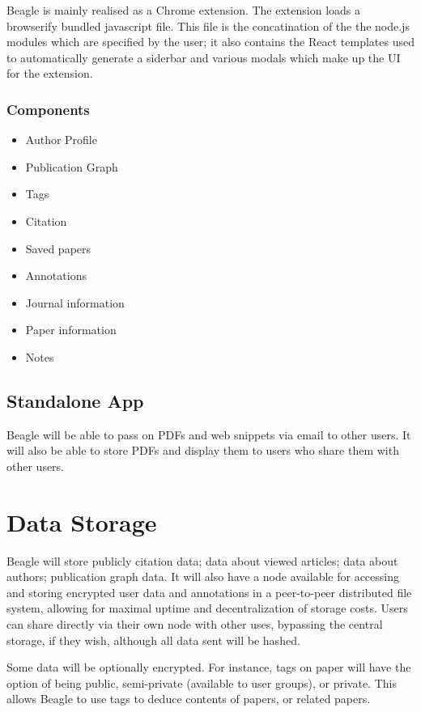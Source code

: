 \documentclass{sig-alternate}
\begin{document}
Beagle is mainly realised as a Chrome extension. The extension loads a browserify
bundled javascript file. This file is the concatination of the the node.js
modules which are specified by the user; it also contains the React templates used
to automatically generate a siderbar and various modals which make up the UI for
the extension.

\subsubsection{Components}
\begin{itemize}
  \item Author Profile
  \item Publication Graph
  \item Tags
  \item Citation
  \item Saved papers
  \item Annotations
  \item Journal information
  \item Paper information
  \item Notes
\end{itemize}

\subsection{Standalone App}

Beagle will be able to pass on PDFs and web snippets via email to other users.
It will also be able to store PDFs and display them to users who share them with
other users.  %



\section{Data Storage}

Beagle will store publicly citation data; data about viewed articles; data about authors;
publication graph data. It will also have a node available for accessing and storing
encrypted user data and annotations in a peer-to-peer distributed file system,
allowing for maximal uptime and decentralization of storage costs. Users can share
directly via their own node with other uses, bypassing the central storage, if
they wish, although all data sent will be hashed.

Some data will be optionally encrypted. For instance, tags on paper will have
the option of being public, semi-private (available to user groups), or private.
This allows Beagle to use tags to deduce contents of papers, or related papers.
\end{document}

